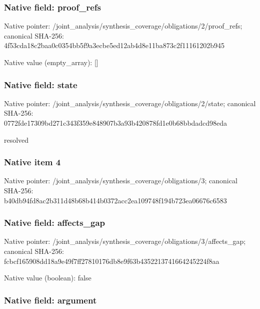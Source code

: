 \documentclass[10pt,a4paper]{article}
\begin{document}
\subsubsection{Native field: proof\_refs}


Native pointer: /joint\_analysis/synthesi\allowbreak{}s\_coverage/obligations/2\allowbreak{}/proof\_refs; canonical SHA-256: 4f53cda18c2baa0c0354bb5f\allowbreak{}9a3ecbe5ed12ab4d8e11ba87\allowbreak{}3c2f11161202b945



Native value (empty\_array): []



\subsubsection{Native field: state}


Native pointer: /joint\_analysis/synthesi\allowbreak{}s\_coverage/obligations/2\allowbreak{}/state; canonical SHA-256: 0772fde17309bd271c343f35\allowbreak{}9e848907b3a93b420878fd1e\allowbreak{}0b68bbdadcd98eda


resolved


\subsubsection{Native item 4}


Native pointer: /joint\_analysis/synthesi\allowbreak{}s\_coverage/obligations/3; canonical SHA-256: b40db94fd8ac2b311d48b68b\allowbreak{}414b0372acc2ea109748f194\allowbreak{}b723ea06676c6583



\subsubsection{Native field: affects\_gap}


Native pointer: /joint\_analysis/synthesi\allowbreak{}s\_coverage/obligations/3\allowbreak{}/affects\_gap; canonical SHA-256: fcbcf165908dd18a9e49f7ff\allowbreak{}27810176db8e9f63b4352213\allowbreak{}741664245224f8aa



Native value (boolean): false



\subsubsection{Native field: argument}
\end{document}
